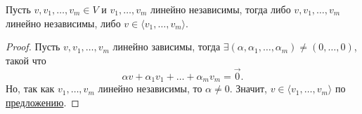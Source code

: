 \begin{lemma}
    \label{lec12:lemma}
    Пусть $v, v_1, \dots, v_m \in V$ и $v_1, \dots, v_m$ линейно независимы, тогда либо $v, v_1, \dots, v_m$ линейно независимы, либо $v \in \langle v_1, \dots , v_m \rangle$.
\end{lemma}

\begin{proof}
    Пусть $v, v_1, \dots, v_m$ линейно зависимы, тогда $\exists (\alpha, \alpha_1, \dots, \alpha_m) \neq (0, \dots, 0)$, такой что
    \begin{equation*}
        \alpha v + \alpha_1 v_1 + \dots + \alpha_m v_m = \overrightarrow{0}
    .\end{equation*}
    Но, так как $v_1, \dots, v_m$ линейно независимы, то $\alpha \neq 0$. Значит, $v \in \langle v_1, \dots, v_m \rangle$ по \hyperref[lec11:proposal_a_i]{предложению}.
\end{proof}
